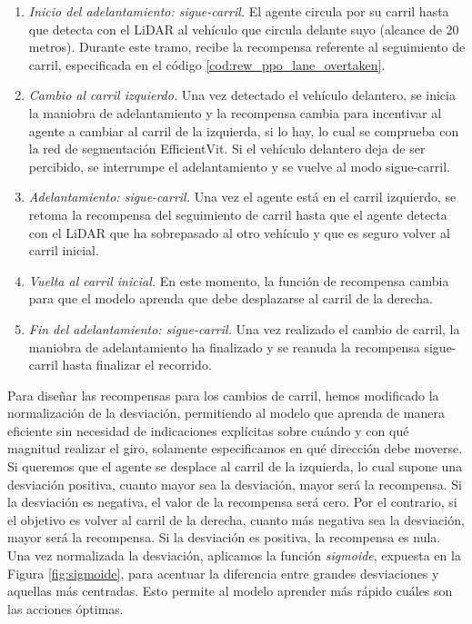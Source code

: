 \begin{enumerate}
\item \textit{Inicio del adelantamiento: sigue-carril.} El agente circula por su carril hasta que detecta con el \ac{LiDAR} al vehículo que circula delante suyo (alcance de 20 metros). Durante este tramo, recibe la recompensa referente al seguimiento de carril, especificada en el código \ref{cod:rew_ppo_lane_overtaken}.
\item \textit{Cambio al carril izquierdo.} Una vez detectado el vehículo delantero, se inicia la maniobra de adelantamiento y la recompensa cambia para incentivar al agente a cambiar al carril de la izquierda, si lo hay, lo cual se comprueba con la red de segmentación EfficientVit. Si el vehículo delantero deja de ser percibido, se interrumpe el adelantamiento y se vuelve al modo sigue-carril.
\item \textit{Adelantamiento: sigue-carril.} Una vez el agente está en el carril izquierdo, se retoma la recompensa del seguimiento de carril hasta que el agente detecta con el \ac{LiDAR} que ha sobrepasado al otro vehículo y que es seguro volver al carril inicial.
\item \textit{Vuelta al carril inicial.} En este momento, la función de recompensa cambia para que el modelo aprenda que debe desplazarse al carril de la derecha.
\item \textit{Fin del adelantamiento: sigue-carril.} Una vez realizado el cambio de carril, la maniobra de adelantamiento ha finalizado y se reanuda la recompensa sigue-carril hasta finalizar el recorrido.
\end{enumerate}

Para diseñar las recompensas para los cambios de carril, hemos modificado la normalización de la desviación, permitiendo al modelo que aprenda de manera eficiente sin necesidad de indicaciones explícitas sobre cuándo y con qué magnitud realizar el giro, solamente especificamos en qué dirección debe moverse. Si queremos que el agente se desplace al carril de la izquierda, lo cual supone una desviación positiva, cuanto mayor sea la desviación, mayor será la recompensa. Si la desviación es negativa, el valor de la recompensa será cero. Por el contrario, si el objetivo es volver al carril de la derecha, cuanto más negativa sea la desviación, mayor será la recompensa. Si la desviación es positiva, la recompensa es nula. Una vez normalizada la desviación, aplicamos la función \textit{sigmoide}, expuesta en la Figura \ref{fig:sigmoide}, para acentuar la diferencia entre grandes desviaciones y aquellas más centradas. Esto permite al modelo aprender más rápido cuáles son las acciones óptimas. 

